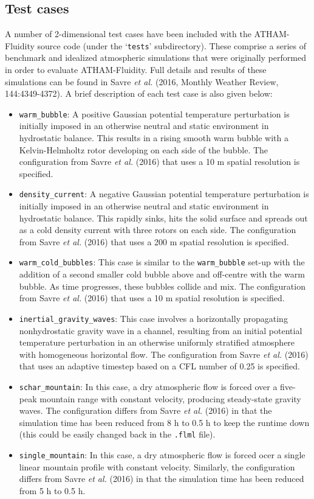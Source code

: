 \documentclass[10pt,a4paper]{article}
\begin{document}
\subsection{Test cases}
A number of 2-dimensional test cases have been included with the ATHAM-Fluidity source code (under the `\texttt{tests}' subdirectory). These comprise a series of benchmark and idealized atmospheric simulations that were originally performed in order to evaluate ATHAM-Fluidity. Full details and results of these simulations can be found in Savre \textit{et al.} (2016, Monthly Weather Review, 144:4349-4372). A brief description of each test case is also given below:

\begin{itemize}
\item \texttt{warm\_bubble}: A positive Gaussian potential temperature perturbation is initially imposed in an otherwise neutral and static environment in hydrostatic balance. This results in a rising smooth warm bubble with a Kelvin-Helmholtz rotor developing on each side of the bubble. The configuration from Savre \textit{et al.} (2016) that uses a 10 m spatial resolution is specified.
\item \texttt{density\_current}: A negative Gaussian potential temperature perturbation is initially imposed in an otherwise neutral and static environment in hydrostatic balance. This rapidly sinks, hits the solid surface and spreads out as a cold density current with three rotors on each side. The configuration from Savre \textit{et al.} (2016) that uses a 200 m spatial resolution is specified.
\item \texttt{warm\_cold\_bubbles}: This case is similar to the \texttt{warm\_bubble} set-up with the addition of a second smaller cold bubble above and off-centre with the warm bubble. As time progresses, these bubbles collide and mix. The configuration from Savre \textit{et al.} (2016) that uses a 10 m spatial resolution is specified.
\item \texttt{inertial\_gravity\_waves}: This case involves a horizontally propagating nonhydrostatic gravity wave in a channel, resulting from an initial potential temperature perturbation in an otherwise uniformly stratified atmosphere with homogeneous horizontal flow. The configuration from Savre \textit{et al.} (2016) that uses an adaptive timestep based on a CFL number of 0.25 is specified.
\item \texttt{schar\_mountain}: In this case, a dry atmospheric flow is forced over a five-peak mountain range with constant velocity, producing steady-state gravity waves. The configuration differs from Savre \textit{et al.} (2016) in that the simulation time has been reduced from 8 h to 0.5 h to keep the runtime down (this could be easily changed back in the \texttt{.flml} file).
\item \texttt{single\_mountain}: In this case, a dry atmospheric flow is forced ocer a single linear mountain profile with constant velocity. Similarly, the configuration differs from Savre \textit{et al.} (2016) in that the simulation time has been reduced from 5 h to 0.5 h.
\end{itemize}
\end{document}

